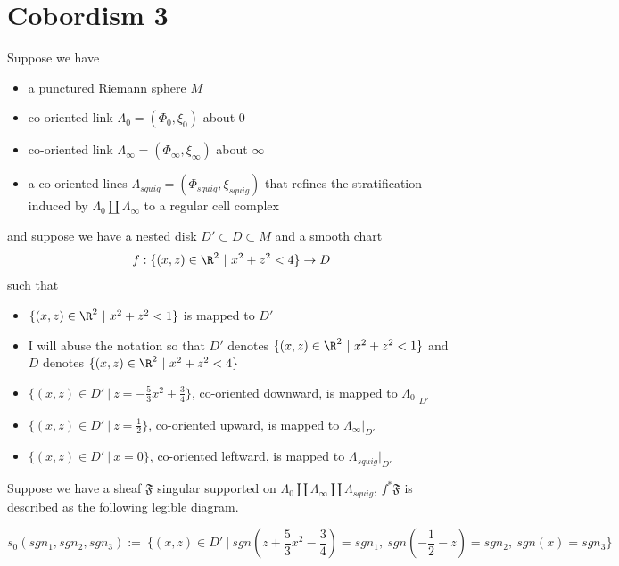\section{Cobordism 3}
Suppose we have 
\begin{itemize}
\item a punctured Riemann sphere $M$

\item co-oriented link $\Lambda_0 = (\Phi_0,\xi_0)$ about $0$

\item co-oriented link $\Lambda_\infty = (\Phi_\infty,\xi_\infty)$ about $\infty$ 

\item a co-oriented lines $\Lambda_{squig} = (\Phi_{squig}, \xi_{squig})$ that refines the stratification induced by $\Lambda_0 \coprod \Lambda_\infty$ to a regular cell complex 
\end{itemize}
and suppose we have a nested disk $D' \subset D \subset M$ and a smooth chart
\[
	f: \{(x,z)\in \R^2 ~|~ x^2+z^2 < 4 \} \rightarrow D
\]
such that 
\begin{itemize}
\item $\{(x,z)\in \R^2 ~|~ x^2+z^2 < 1\}$ is mapped to $D'$ 

\item I will abuse the notation so that $D'$ denotes $\{(x,z)\in \R^2 ~|~ x^2+z^2 < 1\}$ and $D$ denotes $\{(x,z)\in \R^2 ~|~ x^2+z^2 < 4 \}$

\item $\{(x,z)\in D' ~|~ z = -\frac{5}{3}x^2 + \frac{3}{4} \}$, co-oriented downward, is mapped to $\Lambda_0 |_{D'}$

\item $\{(x,z)\in D' ~|~ z = \frac{1}{2} \}$, co-oriented upward, is mapped to $\Lambda_\infty |_{D'}$

\item $\{(x,z)\in D' ~|~ x = 0 \}$, co-oriented leftward, is mapped to $\Lambda_{squig} |_{D'}$
\end{itemize}
Suppose we have a sheaf $\mathfrak{F}$ singular supported on $\Lambda_0 \coprod \Lambda_\infty \coprod \Lambda_{squig}$, $f^*\mathfrak{F}$ is described as the following legible diagram.

\begin{definition}
\[
s_0(sgn_1,sgn_2,sgn_3):=~ \{(x,z) \in D' ~|~ sgn(z+\frac{5}{3}x^2 - \frac{3}{4})=sgn_1,~ sgn(-\frac{1}{2}-z)=sgn_2,~ sgn(x)=sgn_3 \}
\]
\end{definition}

